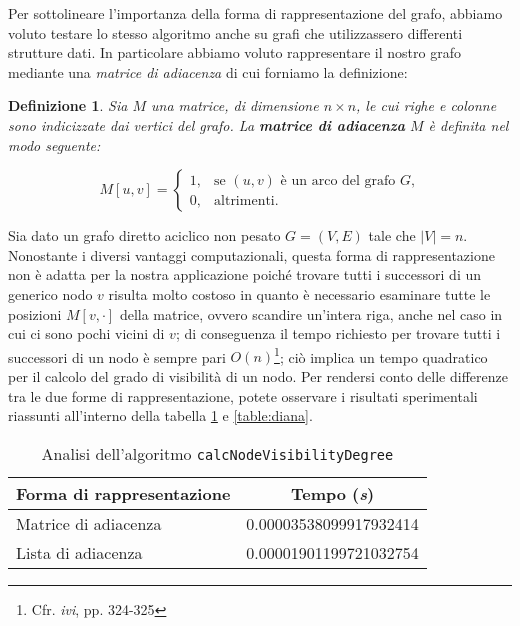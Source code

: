 \documentclass[10pt,a4paper,titlepage]{article}
\newtheorem{thm}{Definizione}
\begin{document}
Per sottolineare l'importanza della forma di rappresentazione del grafo, abbiamo voluto testare lo stesso algoritmo anche su grafi che utilizzassero differenti strutture dati. In particolare abbiamo voluto rappresentare il nostro grafo mediante una \textit{matrice di adiacenza} di cui forniamo la definizione:

\begin{thm}\label{thm:def5}
Sia $M$ una matrice, di dimensione $n \times n$, le cui righe e colonne sono indicizzate dai vertici del grafo. La \textbf{matrice di adiacenza} $M$ è definita nel modo seguente:

\[
M[u,v]=
\begin{cases}
1,
 & \text{se $(u, v)$ è un arco del grafo $G$,} \\
0, & \text{altrimenti.}
\end{cases}
\]
\end{thm}

Sia dato un grafo diretto aciclico non pesato $G = (V, E)$ tale che $|V| = n$. Nonostante i diversi vantaggi computazionali, questa forma di rappresentazione non è adatta per la nostra applicazione poiché trovare tutti i successori di un generico nodo $v$ risulta molto costoso in quanto è necessario esaminare tutte le posizioni $M[v,\cdot]$ della matrice, ovvero scandire un'intera riga, anche nel caso in cui ci sono pochi vicini di $v$; di conseguenza il tempo richiesto per trovare tutti i successori di un nodo è sempre pari $O(n)$\footnote{Cfr. \textit{ivi}, pp. 324-325}; ciò implica un tempo quadratico per il calcolo del grado di visibilità di un nodo. Per rendersi conto delle differenze tra le due forme di rappresentazione, potete osservare i risultati sperimentali riassunti all'interno della tabella \ref{table:akko} e \ref{table:diana}.


\begin{table}
\caption{Analisi dell'algoritmo \texttt{calcNodeVisibilityDegree}}\label{table:akko}
\begin{center}
\begin{tabular}{lc}

\toprule
Forma di rappresentazione & Tempo (\textit{s}) \\

\midrule

Matrice di adiacenza & 0.00003538099917932414 \\
Lista di adiacenza & 0.00001901199721032754 \\

\bottomrule
\end{tabular}
\end{center}
\end{table}
\end{document}
